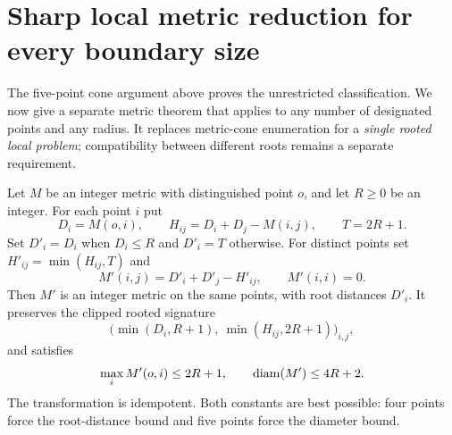 \section{Sharp local metric reduction for every boundary size}\label{sec:rooted-truncation}
The five-point cone argument above proves the unrestricted classification.
We now give a separate metric theorem that applies to any number of designated
points and any radius. It replaces metric-cone enumeration for a \emph{single
rooted local problem}; compatibility between different roots remains a
separate requirement.

\begin{theorem}\label{thm:rooted-truncation}
Let $M$ be an integer metric with distinguished point $o$, and let $R\ge0$ be
an integer. For each point $i$ put
\[
 D_i=M(o,i),\qquad H_{ij}=D_i+D_j-M(i,j),\qquad T=2R+1.
\]
Set $D'_i=D_i$ when $D_i\le R$ and $D'_i=T$ otherwise. For distinct points set
$H'_{ij}=\min(H_{ij},T)$ and
\[
 M'(i,j)=D'_i+D'_j-H'_{ij},\qquad M'(i,i)=0.
\]
Then $M'$ is an integer metric on the same points, with root distances $D'_i$.
It preserves the clipped rooted signature
\[
 \bigl(\min(D_i,R+1),\ \min(H_{ij},2R+1)\bigr)_{i,j},
\]
and satisfies
\[
 \max_i M'(o,i)\le2R+1,\qquad \operatorname{diam}(M')\le4R+2.
\]
The transformation is idempotent. Both constants are best possible:
four points force the root-distance bound and five points force the diameter
bound.
\end{theorem}

